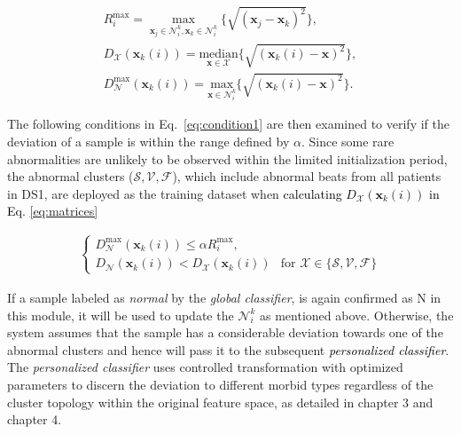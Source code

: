 \begin{align}
R_i^{\max}=\underset{\mathbf{x}_j\in\mathcal{N}_i^k,\mathbf{x}_k\in\mathcal{N}_i^k}{\max}\{\sqrt{(\mathbf{x}_j-\mathbf{x}_k)^2}\},\\
\label{eq:matrices}
D_\mathcal{X}(\mathbf{x}_k(i))=\underset{\mathbf{x} \in\mathcal{X}}{\text{median}}\{\sqrt{(\mathbf{x}_k(i)-\mathbf{x})^2}\},
\\
D_\mathcal{N}^{\max}(\mathbf{x}_k(i))=\underset{\mathbf{x} \in\mathcal{N}_i^k}{\text{max}}\{\sqrt{(\mathbf{x}_k(i)-\mathbf{x})^2}\}.
\end{align}

The following conditions in Eq.~\ref{eq:condition1} are then examined to verify if the deviation of a sample is within the range defined by $\alpha$. Since some rare abnormalities are unlikely to be observed within the limited initialization period, the abnormal clusters (${\mathcal{S},\mathcal{V},\mathcal{F}}$), which include abnormal beats from all patients in DS1, are deployed as the training dataset when \textcolor{black}{calculating $D_\mathcal{X}(\mathbf{x}_k(i))$ in Eq. \ref{eq:matrices}} %

\begin{align}\label{eq:condition1}
\begin{cases}
D_\mathcal{N}^{\max}(\mathbf{x}_k(i))  \leq\alpha R_i^{\max},\\
D_\mathcal{N}(\mathbf{x}_k(i)) < D_\mathcal{X}(\mathbf{x}_k(i)) &\text{for~} \mathcal{X}\in\{\mathcal{S},\mathcal{V},\mathcal{F}\}   %
\end{cases}
\end{align}

If a sample labeled as \textit{normal} by the \textit{global classifier}, is again confirmed as N in this module, it will be used to update the $\mathcal{N}_i^k$ as mentioned above. Otherwise, the system assumes that the sample has a considerable deviation towards one of the abnormal clusters and hence will pass it to the subsequent \textcolor{black}{\textit{personalized classifier}}. The \textit{personalized classifier} uses controlled transformation with optimized parameters to discern the deviation to different morbid types regardless of the cluster topology within the original feature space, as detailed in chapter 3 and chapter 4. 

